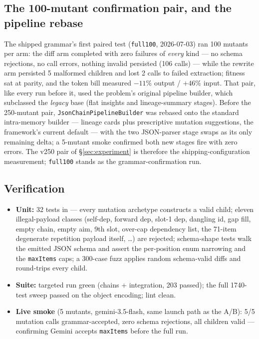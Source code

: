 \documentclass[11pt]{article}
\begin{document}
\subsection{The 100-mutant confirmation pair, and the pipeline rebase}
\label{sec:full100}
The shipped grammar's first paired test (\texttt{full100}, 2026-07-03) ran 100 mutants per
arm: the diff arm completed with zero failures of \emph{every} kind --- no schema
rejections, no call errors, nothing invalid persisted (106 calls) --- while the rewrite arm
persisted 5 malformed children and lost 2 calls to failed extraction; fitness sat at
parity, and the token bill measured $-11\%$ output / $+46\%$ input. That pair, like every
run before it, used the problem's original pipeline builder, which subclassed the
\emph{legacy} base (flat insights and lineage-summary stages). Before the 250-mutant pair,
\texttt{JsonChainPipelineBuilder} was rebased onto the standard intra-memory builder ---
lineage cards plus prescriptive mutation suggestions, the framework's current default ---
with the two JSON-parser stage swaps as its only remaining delta; a 5-mutant smoke
confirmed both new stages fire with zero errors. The v250 pair of \S\ref{sec:experiment}
is therefore the shipping-configuration measurement; \texttt{full100} stands as the
grammar-confirmation run.

\subsection{Verification}
\begin{itemize}
  \item \textbf{Unit:} 32 tests in  --- every mutation
  archetype constructs a valid child; eleven illegal-payload classes (self-dep, forward dep,
  slot-1 dep, dangling id, gap fill, empty chain, empty aim, 9th slot, over-cap dependency
  list, the 71-item degenerate repetition payload itself, \dots) are rejected; schema-shape
  tests walk the emitted JSON schema and assert the per-position enum narrowing and the
  \texttt{maxItems} caps; a 300-case fuzz applies random schema-valid diffs and round-trips
  every child.
  \item \textbf{Suite:} targeted run green (chains + integration, 203 passed); the full
  1740-test sweep passed on the object encoding; lint clean.
  \item \textbf{Live smoke} (5 mutants, gemini-3.5-flash, same launch path as the A/B):
  5/5 mutation calls grammar-accepted, zero schema rejections, all children valid ---
  confirming Gemini accepts \texttt{maxItems} before the full run.
\end{itemize}
\end{document}
